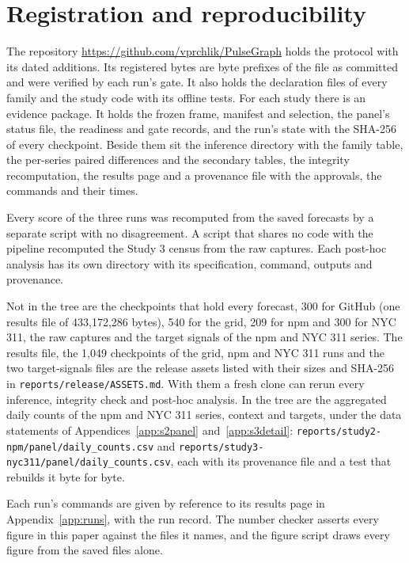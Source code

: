 \providecommand{\qs}{QScore9}

\section{Registration and reproducibility}
\label{sec:repro}

The repository \url{https://github.com/vprchlik/PulseGraph} holds the protocol with its dated additions. Its
registered bytes are byte prefixes of the file as committed and were verified by each run's gate. It also
holds the declaration files of every family and the study code with its offline tests. For each study there is
an evidence package. It holds the frozen frame, manifest and selection, the panel's status file, the readiness
and gate records, and the run's state with the SHA-256 of every checkpoint. Beside them sit the inference
directory with the family table, the per-series paired differences and the secondary tables, the integrity
recomputation, the results page and a provenance file with the approvals, the commands and their times.

Every score of the three runs was recomputed from the saved forecasts by a separate script with no
disagreement. A script that shares no code with the pipeline recomputed the Study 3 census from the raw
captures. Each post-hoc analysis has its own directory with its specification, command, outputs and
provenance.

Not in the tree are the checkpoints that hold every forecast, 300 for GitHub (one results file of 433,172,286
bytes), 540 for the grid, 209 for npm and 300 for NYC 311, the raw captures and the target signals of the npm
and NYC 311 series. The results file, the 1,049 checkpoints of the grid, npm and NYC 311 runs and the two
target-signals files are the release assets listed with their sizes and SHA-256 in
\texttt{reports/release/ASSETS.md}. With them a fresh clone can rerun every inference, integrity check and
post-hoc analysis. In the tree are the aggregated daily counts of the npm and NYC 311 series, context and
targets, under the data statements of Appendices~\ref{app:s2panel} and~\ref{app:s3detail}:
\texttt{reports/study2-npm/panel/daily\_counts.csv} and
\texttt{reports/study3-nyc311/panel/daily\_counts.csv}, each with its provenance file and a test that rebuilds
it byte for byte.

Each run's commands are given by reference to its results page in Appendix~\ref{app:runs}, with the run
record. The number checker asserts every figure in this paper against the files it names, and the figure
script draws every figure from the saved files alone.
